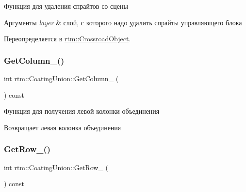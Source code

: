 Функция для удаления спрайтов со сцены 


\begin{DoxyParams}{Аргументы}
{\em layer} & слой, с которого надо удалить спрайты управляющего блока \\
\hline
\end{DoxyParams}


Переопределяется в \hyperlink{classrtm_1_1_crossroad_object_a92e9357697edecc69564fd4d40524a3b}{rtm\+::\+Crossroad\+Object}.

\mbox{\label{classrtm_1_1_coating_union_a1d2b6a339f6cafbe41d416f371cbed04}} 
\subsubsection{\texorpdfstring{Get\+Column\+\_\+()}{GetColumn\_()}}
{\footnotesize\ttfamily int rtm\+::\+Coating\+Union\+::\+Get\+Column\+\_\+ (\begin{DoxyParamCaption}{ }\end{DoxyParamCaption}) const\hspace{0.3cm}{\ttfamily [protected]}}



Функция для получения левой колонки объединения 

\begin{DoxyReturn}{Возвращает}
левая колонка объединения 
\end{DoxyReturn}
\mbox{\label{classrtm_1_1_coating_union_ad283fd24e0c3347c569e3ea5772a9651}} 
\subsubsection{\texorpdfstring{Get\+Row\+\_\+()}{GetRow\_()}}
{\footnotesize\ttfamily int rtm\+::\+Coating\+Union\+::\+Get\+Row\+\_\+ (\begin{DoxyParamCaption}{ }\end{DoxyParamCaption}) const\hspace{0.3cm}{\ttfamily [protected]}}



